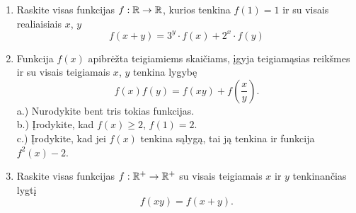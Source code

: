\begin{enumerate}
  \item Raskite visas funkcijas $f:\mathbb R\to\mathbb R$, kurios tenkina $f(1)=1$ ir su
    visais realiaisiais $x$, $y$ $$f(x+y)=3^y\cdot f(x)+2^x\cdot f(y)$$
  \item \text{[LitMo 2008]} Funkcija $f(x)$ apibrėžta teigiamiems
    skaičiams, įgyja teigiamąsias reikšmes ir su visais teigiamais $x$,
    $y$ tenkina lygybę $$f(x)f(y) = f(xy) + f(\frac{x}{y}).$$
    a.) Nurodykite bent tris tokias funkcijas.  \\[0.5cm]
    b.) Įrodykite, kad $f(x)\geq 2$, $f(1)=2$.  \\[0.5cm]
    c.) Įrodykite, kad jei $f(x)$ tenkina sąlygą, tai ją tenkina ir
    funkcija $f^2(x)-2$.
  \item Raskite visas funkcijas $f:\mathbb R ^{+}\to \mathbb R ^{+}$ su visais teigiamais
    $x$ ir $y$ tenkinančias lygtį $$f(xy)=f(x+y).$$

\end{enumerate}
